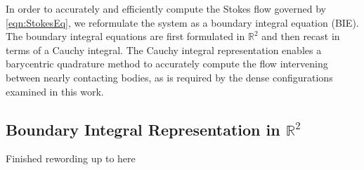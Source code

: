 \documentclass[3p]{elsarticle}
\newcommand{\vsp}[1]{\vspace{#1 pc} \noindent}
\newcommand{\nick}[1]{ {\color{red} #1} }
\newcommand{\RR}{{\mathbb{R}}}
\begin{document}
In order to accurately and efficiently compute the Stokes flow governed
  by \eqref{eqn:StokesEq}, we reformulate the system as a boundary
  integral equation (BIE). The boundary integral equations are first
  formulated in $\RR^2$ and then recast in terms of a Cauchy integral.
  The Cauchy integral representation enables a barycentric quadrature
  method to accurately compute the flow intervening between nearly
  contacting bodies, as is required by the dense configurations examined
  in this work.


\subsection{Boundary Integral Representation in $\RR^2$}

\vsp{2} \nick{Finished rewording up to here} \vsp{2}
\end{document}
